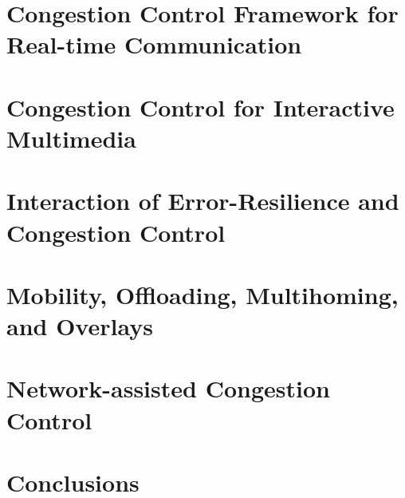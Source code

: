 \documentclass[dissertation,final]{aaltoseries} %
\begin{document}
\chapter{Congestion Control Framework for Real-time Communication}
\label{chap:cc.fw}


\chapter{Congestion Control for Interactive Multimedia}
\label{chap:cc}


 \chapter{Interaction of Error-Resilience and Congestion Control}
 \label{chap:er-cc}


\chapter{Mobility, Offloading, Multihoming, and Overlays}
\label{chap:mprtp}


 \chapter{Network-assisted Congestion Control}
 \label{chap:cc.nw}
 

\chapter{Conclusions}
\label{chap:conc}
 








%
\end{document}
